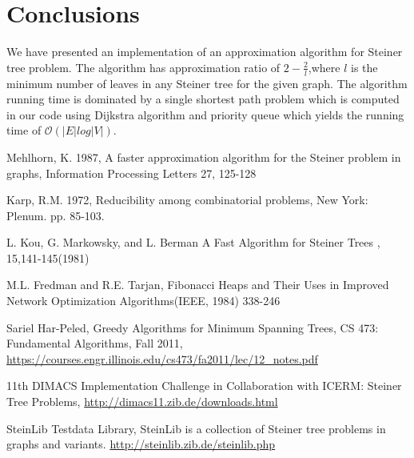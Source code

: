 \documentclass[a4paper,10pt]{article}
\begin{document}
\section{Conclusions}
We have presented an implementation of an approximation algorithm for Steiner tree problem. The algorithm has approximation ratio of $2 - \frac{2}{l}$,where $ l $ is the minimum number of leaves in any Steiner tree for the given graph. The algorithm running time is dominated by a single shortest path problem which is computed in our code using Dijkstra algorithm and priority queue which yields the running time of $\mathcal{O}(|E|log|V|)$.   





\begin{thebibliography}{}

   Mehlhorn, K. 1987,
      A faster approximation algorithm for the Steiner problem in graphs,
      Information Processing Letters 27, 125-128

   Karp, R.M. 1972,
      \newblock Reducibility among combinatorial problems,
       New York: Plenum. pp. 85-103.
	
	  L. Kou, G. Markowsky, and L. Berman
	     \newblock A Fast Algorithm for Steiner Trees
	     , 15,141-145(1981)   
	
	
	  M.L. Fredman and R.E. Tarjan, Fibonacci Heaps 
	and Their Uses in Improved Network Optimization Algorithms(IEEE, 1984) 338-246

	  Sariel Har-Peled,
	\newblock Greedy Algorithms for Minimum
	Spanning Trees, CS 473: Fundamental Algorithms, Fall 2011,
	\url{https://courses.engr.illinois.edu/cs473/fa2011/lec/12_notes.pdf}
	
	 11th DIMACS Implementation Challenge in Collaboration with ICERM:
		Steiner Tree Problems,
		\url{http://dimacs11.zib.de/downloads.html}	
	
	 SteinLib Testdata Library,
		SteinLib is a collection of Steiner tree problems in graphs and variants.
			\url{http://steinlib.zib.de/steinlib.php}
	
	
\end{thebibliography}
\end{document}
